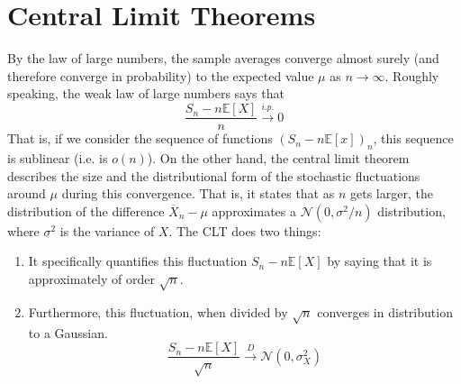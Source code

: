 \section{Central Limit Theorems}

  By the law of large numbers, the sample averages converge almost surely (and therefore converge in probability) to the expected value $\mu$ as $n \rightarrow \infty$. Roughly speaking, the weak law of large numbers says that 
  \begin{equation}
    \frac{S_n - n \mathbb{E}[X]}{n} \xrightarrow{i.p.} 0
  \end{equation}
  That is, if we consider the sequence of functions $(S_n - n \mathbb{E}[x])_{n}$, this sequence is sublinear (i.e. is $o(n)$). On the other hand, the central limit theorem describes the size and the distributional form of the stochastic fluctuations around $\mu$ during this convergence. That is, it states that as $n$ gets larger, the distribution of the difference $\overline{X}_n - \mu$ approximates a $\mathcal{N}(0, \sigma^2 / n)$ distribution, where $\sigma^2$ is the variance of $X$. The CLT does two things: 
  \begin{enumerate}
    \item It specifically quantifies this fluctuation $S_n - n \mathbb{E}[X]$ by saying that it is approximately of order $\sqrt{n}$. 
    \item Furthermore, this fluctuation, when divided by $\sqrt{n}$ converges in distribution to a Gaussian. 
    \begin{equation}
      \frac{S_n - n \mathbb{E}[X]}{\sqrt{n}} \xrightarrow{D} \mathcal{N}(0, \sigma_X^2)
    \end{equation}
  \end{enumerate}

